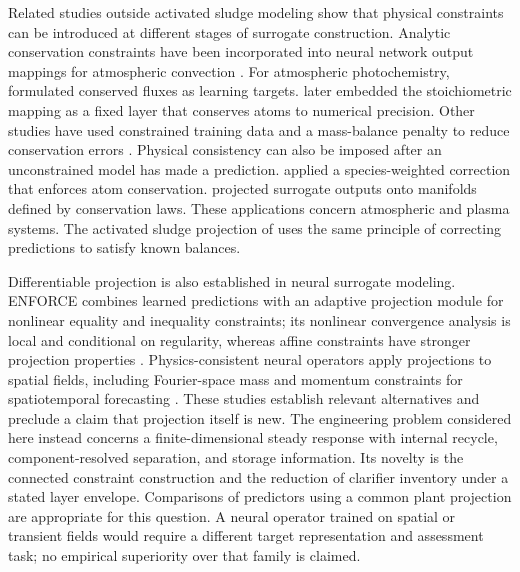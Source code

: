 \documentclass[a4paper,fleqn]{cas-sc}
\begin{document}
Related studies outside activated sludge modeling show that physical constraints can be introduced at different stages of surrogate construction. Analytic conservation constraints have been incorporated into neural network output mappings for atmospheric convection \citep{Beucler2021}. For atmospheric photochemistry, \citet{SturmWexler2020} formulated conserved fluxes as learning targets. \citet{SturmWexler2022} later embedded the stoichiometric mapping as a fixed layer that conserves atoms to numerical precision. Other studies have used constrained training data and a mass-balance penalty to reduce conservation errors \citep{Ruckstuhl2021}. Physical consistency can also be imposed after an unconstrained model has made a prediction. \citet{SturmSilva2025} applied a species-weighted correction that enforces atom conservation. \citet{Valente2025} projected surrogate outputs onto manifolds defined by conservation laws. These applications concern atmospheric and plasma systems. The activated sludge projection of \citet{Selerio2026} uses the same principle of correcting predictions to satisfy known balances.

Differentiable projection is also established in neural surrogate modeling. ENFORCE combines learned predictions with an adaptive projection module for nonlinear equality and inequality constraints; its nonlinear convergence analysis is local and conditional on regularity, whereas affine constraints have stronger projection properties \citep{LastrucciSchweidtmann2026}. Physics-consistent neural operators apply projections to spatial fields, including Fourier-space mass and momentum constraints for spatiotemporal forecasting \citep{Xu2025}. These studies establish relevant alternatives and preclude a claim that projection itself is new. The engineering problem considered here instead concerns a finite-dimensional steady response with internal recycle, component-resolved separation, and storage information. Its novelty is the connected constraint construction and the reduction of clarifier inventory under a stated layer envelope. Comparisons of predictors using a common plant projection are appropriate for this question. A neural operator trained on spatial or transient fields would require a different target representation and assessment task; no empirical superiority over that family is claimed.
\end{document}
